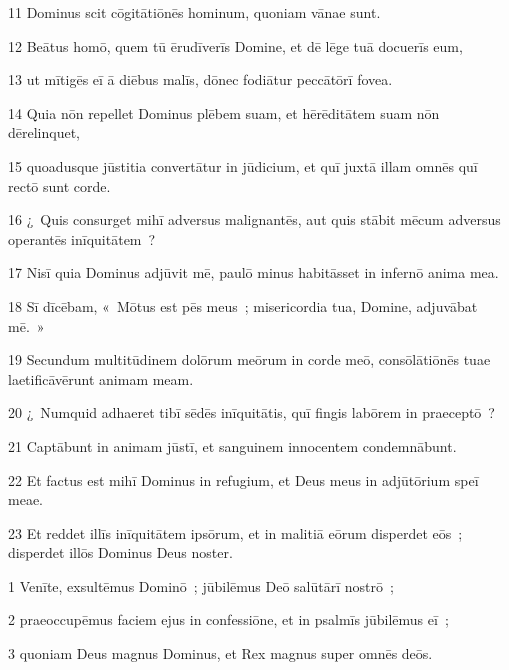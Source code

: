 \psalmVerse
  {\phantom{0}11}
  {Dominus scit cōgitātiōnēs hominum, quoniam vānae sunt.}


\psalmVerse
  {\phantom{0}12}
  {Beātus homō, quem tū ērudīverīs Domine, et dē lēge tuā docuerīs eum,}


\psalmVerse
  {\phantom{0}13}
  {ut mītigēs eī ā diēbus malīs, dōnec fodiātur peccātōrī fovea.}


\psalmVerse
  {\phantom{0}14}
  {Quia nōn repellet Dominus plēbem suam, et hērēditātem suam nōn dērelinquet,}


\psalmVerse
  {\phantom{0}15}
  {quoadusque jūstitia convertātur in jūdicium, et quī juxtā illam omnēs quī rectō sunt corde.}


\psalmVerse
  {\phantom{0}16}
  {¿~Quis consurget mihī adversus malignantēs, aut quis stābit mēcum adversus operantēs inīquitātem~?}


\psalmVerse
  {\phantom{0}17}
  {Nisī quia Dominus adjūvit mē, paulō minus habitāsset in infernō anima mea.}


\psalmVerse
  {\phantom{0}18}
  {Sī dīcēbam, «~Mōtus est pēs meus~; misericordia tua, Domine, adjuvābat mē.~»}


\psalmVerse
  {\phantom{0}19}
  {Secundum multitūdinem dolōrum meōrum in corde meō, consōlātiōnēs tuae laetificāvērunt animam meam.}


\psalmVerse
  {\phantom{0}20}
  {¿~Numquid adhaeret tibī sēdēs inīquitātis, quī fingis labōrem in praeceptō~?}


\psalmVerse
  {\phantom{0}21}
  {Captābunt in animam jūstī, et sanguinem innocentem condemnābunt.}


\psalmVerse
  {\phantom{0}22}
  {Et factus est mihī Dominus in refugium, et Deus meus in adjūtōrium speī meae.}


\psalmVerse
  {\phantom{0}23}
  {Et reddet illīs inīquitātem ipsōrum, et in malitiā eōrum disperdet eōs~; disperdet illōs Dominus Deus noster.}




\psalmVerse
  {\phantom{00}1}
  {Venīte, exsultēmus Dominō~; jūbilēmus Deō salūtārī nostrō~;}


\psalmVerse
  {\phantom{00}2}
  {praeoccupēmus faciem ejus in confessiōne, et in psalmīs jūbilēmus eī~;}


\psalmVerse
  {\phantom{00}3}
  {quoniam Deus magnus Dominus, et Rex magnus super omnēs deōs.}


